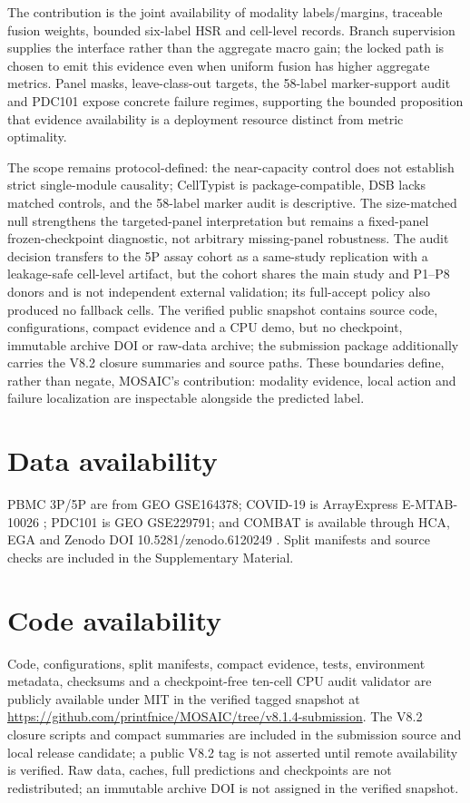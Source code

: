 \documentclass[unnumsec,webpdf,contemporary,large,numbered]{oup-authoring-template}
\begin{document}
The contribution is the joint availability of modality labels/margins, traceable fusion weights, bounded six-label HSR and cell-level records. Branch supervision supplies the interface rather than the aggregate macro gain; the locked path is chosen to emit this evidence even when uniform fusion has higher aggregate metrics. Panel masks, leave-class-out targets, the 58-label marker-support audit and PDC101 expose concrete failure regimes, supporting the bounded proposition that evidence availability is a deployment resource distinct from metric optimality.

The scope remains protocol-defined: the near-capacity control does not establish strict single-module causality; CellTypist is package-compatible, DSB lacks matched controls, and the 58-label marker audit is descriptive. The size-matched null strengthens the targeted-panel interpretation but remains a fixed-panel frozen-checkpoint diagnostic, not arbitrary missing-panel robustness. The audit decision transfers to the 5P assay cohort as a same-study replication with a leakage-safe cell-level artifact, but the cohort shares the main study and P1--P8 donors and is not independent external validation; its full-accept policy also produced no fallback cells. The verified public snapshot contains source code, configurations, compact evidence and a CPU demo, but no checkpoint, immutable archive DOI or raw-data archive; the submission package additionally carries the V8.2 closure summaries and source paths. These boundaries define, rather than negate, MOSAIC's contribution: modality evidence, local action and failure localization are inspectable alongside the predicted label.

\section{Data availability}

PBMC 3P/5P are from GEO GSE164378; COVID-19 is ArrayExpress E-MTAB-10026 \citep{stephenson2021}; PDC101 is GEO GSE229791; and COMBAT is available through HCA, EGA and Zenodo DOI 10.5281/zenodo.6120249 \citep{combat2022}. Split manifests and source checks are included in the Supplementary Material.

\section{Code availability}

Code, configurations, split manifests, compact evidence, tests, environment metadata, checksums and a checkpoint-free ten-cell CPU audit validator are publicly available under MIT in the verified tagged snapshot at \url{https://github.com/printfnice/MOSAIC/tree/v8.1.4-submission}. The V8.2 closure scripts and compact summaries are included in the submission source and local release candidate; a public V8.2 tag is not asserted until remote availability is verified. Raw data, caches, full predictions and checkpoints are not redistributed; an immutable archive DOI is not assigned in the verified snapshot.
\end{document}
